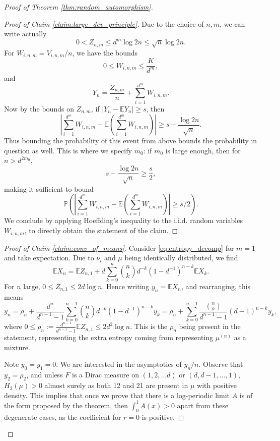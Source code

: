 \documentclass[11pt]{article}
\newcommand{\PP}{\mathbb{P}}
\newcommand{\EE}{\mathbb{E}}
\theoremstyle{definition}
\begin{document}
\begin{proof}[Proof of Theorem \ref{thm:random_automorphism}]
    \begin{proof}[Proof of Claim \ref{claim:large_dev_principle}]
    Due to the choice of $n, m$, we can write actually $$0<Z_{n,m}\leq d^m\log 2n\leq \sqrt n \log 2n.$$
    For $W_{i, n, m}=V_{i, n, m}/n$, we have the bounds
    $$0\leq W_{i, n, m}\leq \frac{K}{d^m},$$
    and
    $$Y_n = \frac{Z_{n,m}}{n} + \sum_{i=1}^{d^m}W_{i, n, m}.$$
    Now by the bounds on $Z_{n,m}$, if $|Y_n - \EE Y_n| \geq s$, then
    $$\left|\sum_{i=1}^{d^m}W_{i, n, m} - \EE\left(\sum_{i=1}^{d^m}W_{i, n, m}\right)\right|\geq s - \frac{\log 2n}{\sqrt n}.$$
    Thus bounding the probability of this event from above bounds the probability in question as well. This is where we specify $m_0$: if $m_0$ is large enough, then for $n>d^{2m_0}$,
    $$s - \frac{\log 2n}{\sqrt n}\geq \frac{s}{2},$$
    making it sufficient to bound
    $$\PP\left(\left|\sum_{i=1}^{d^m}W_{i, n, m} - \EE\left(\sum_{i=1}^{d^m}W_{i, n, m}\right)\right|\geq s/2\right).$$
    We conclude by applying Hoeffding's inequality to the i.i.d. random variables $W_{i, n, m}$, to directly obtain the statement of the claim. 
    \end{proof} 
    
    \begin{proof}[Proof of Claim \ref{claim:conv_of_means}]
    Consider \eqref{eq:entropy_decomp} for $m=1$ and take expectation. Due to $\nu_i$ and $\mu$ being identically distributed, we find
    $$\EE X_n = \EE Z_{n, 1} + d \sum_{k=0}^{n}\binom{n}{k}d^{-k}(1-d^{-1})^{n-k} \EE X_k.$$
    For $n$ large, $0 \leq Z_{n, 1} \leq 2d \log n$. Hence
    writing $y_n=\EE X_n$, and rearranging, this means
    \begin{equation}\label{eq:rearranged}
    y_n = \rho_n + \frac{d^n}{d^{n-1}-1}\sum_{k=0}^{n-1}\binom{n}{k}d^{-k}(1-d^{-1})^{n-k} y_k=\rho_n + \sum_{k=0}^{n-1}\frac{\binom{n}{k}}{d^{n-1}-1}(d-1)^{n-k}y_k,
    \end{equation}
    where $0\leq \rho_n:=\frac{d^{n-1}}{d^{n-1}-1}\EE Z_{n, 1} \leq 2d^2 \log n$. This is the $\rho_n$ being present in the statement, representing the extra entropy coming from representing $\mu^{(n)}$ as a mixture.
    
    Note $y_0=y_1=0$. We are interested in the asymptotics of $y_n/n$. Observe that $y_2=\rho_2$, and unless $F$ is a Dirac measure on $(1, 2, \dots d)$ or $(d, d-1, \dots, 1)$, $H_2(\mu)>0$ almost surely as both 12 and 21 are present in $\mu$ with positive density. This implies that once we prove that there is a log-periodic limit $A$ is of the form proposed by the theorem, then $\int_{0}^{1}A(x)>0$ apart from these degenerate cases, as the coefficient for $r=0$ is positive.


\end{proof}
\end{proof}
\end{document}
